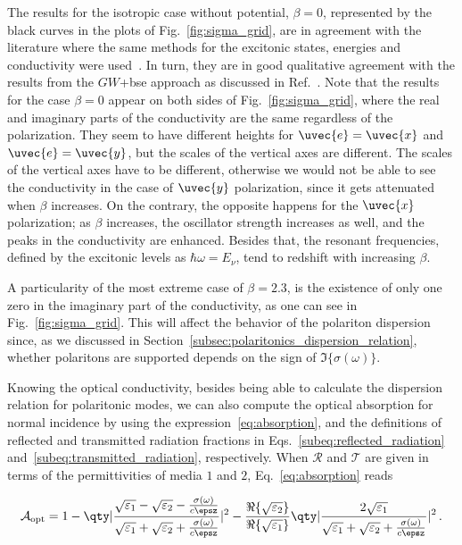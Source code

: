 The results for the isotropic case without potential, $\beta=0$, represented by the black curves in the plots of Fig.~\ref{fig:sigma_grid}, are in agreement with the literature where the same methods for the excitonic states, energies and conductivity  were used~\cite{Ventura_2019,Ferreira_2019}.
In turn, they are in good qualitative agreement with the results from the $GW$+\gls{bse} approach as discussed in Ref.~\cite{Ferreira_2019}.
Note that the results for the case $\beta=0$ appear on both sides of Fig.~\ref{fig:sigma_grid}, where the real and imaginary parts of the conductivity are the same regardless of the polarization.
They seem to have different heights for $\uvec{e}=\uvec{x}$ and $\uvec{e}=\uvec{y}$, but the scales of the vertical axes are different.
The scales of the vertical axes have to be different, otherwise we would not be able to see the conductivity in the case of $\uvec{y}$ polarization, since it gets attenuated when $\beta$ increases.
On the contrary, the opposite happens for the $\uvec{x}$ polarization; as $\beta$ increases, the oscillator strength increases as well, and the peaks in the conductivity are enhanced.
Besides that, the resonant frequencies, defined by the excitonic levels as $\hbar \omega = E_{\nu}$, tend to redshift with increasing $\beta$.

A particularity of the most extreme case of $\beta=2.3$, is the existence of only one zero in the imaginary part of the conductivity, as one can see in Fig.~\ref{fig:sigma_grid}.
This will affect the behavior of the polariton dispersion since, as we discussed in Section~\ref{subsec:polaritonics_dispersion_relation}, whether polaritons are supported depends on the sign of $\Im \{ \sigma(\omega) \}$.

Knowing the optical conductivity, besides being able to calculate the dispersion relation for polaritonic modes, we can also compute the optical absorption for normal incidence by using the expression~\eqref{eq:absorption}, and the definitions of reflected and transmitted radiation fractions in Eqs.~\eqref{subeq:reflected_radiation} and~\eqref{subeq:transmitted_radiation}, respectively.
When $\mathcal{R}$ and $\mathcal{T}$ are given in terms of the permittivities of media $1$ and $2$, Eq.~\eqref{eq:absorption} reads

\begin{equation} \label{eq:optical_absorption_repeated}
        \mathcal{A}_{\mathrm{opt}} = 1 - \qty|\frac{\sqrt{\varepsilon_1} - \sqrt{\varepsilon_2}  - \frac{\sigma(\omega)}{c \epsz}}{\sqrt{\varepsilon_1} + \sqrt{\varepsilon_2} + \frac{\sigma(\omega)}{c \epsz}}|^2 - \frac{\Re\{\sqrt{\varepsilon_2}\}}{\Re\{\sqrt{\varepsilon_1}\}} \qty|\frac{2\sqrt{\varepsilon_1}}{\sqrt{\varepsilon_1} + \sqrt{\varepsilon_2} + \frac{\sigma(\omega)}{c \epsz}}|^2 \,.
\end{equation}

